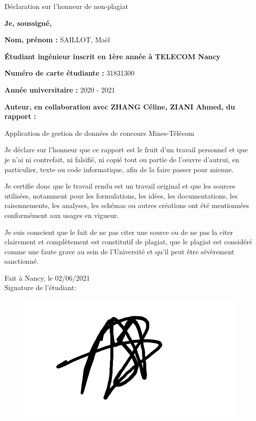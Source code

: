 

%

\begin{center}
\LARGE
    Déclaration sur l'honneur de non-plagiat
\end{center}

\textbf{Je, soussigné,} 

\textbf{Nom, prénom :} SAILLOT, Maël

\textbf{Étudiant ingénieur inscrit en 1ère année à TELECOM Nancy} 

\textbf{Numéro de carte étudiante :} 31831300

\textbf{Année universitaire :} 2020 - 2021 

\textbf{Auteur, en collaboration avec ZHANG Céline, ZIANI Ahmed, du rapport : } 

\begin{center}
\Large
    Application de gestion de données de concours Mines-Télécom 
\end{center}


Je déclare sur l’honneur que ce rapport est le fruit d’un travail personnel et que je n’ai ni contrefait, ni falsifié, ni copié tout ou partie de l’œuvre d’autrui, en particulier, texte ou code informatique, afin de la faire passer pour mienne.

Je certifie donc que le travail rendu est un travail original et que les sources utilisées, notamment pour les formulations, les idées, les documentations, les raisonnements, les analyses, les schémas ou autres créations ont été mentionnées conformément aux usages en vigueur.

Je suis conscient que le fait de ne pas citer une source ou de ne pas la citer clairement et complètement est constitutif de plagiat, que le plagiat est considéré comme une faute grave au sein de l’Université et qu’il peut être sévèrement sanctionné. \\


\begin{flushright}
Fait à Nancy, le 02/06/2021 \\
Signature de l'étudiant:
\end{flushright}
\begin{figure}[!h]
    \begin{flushright}
        \includegraphics[scale=0.35]{Images/Signatures/Signature_MS.png}
    \end{flushright}
\end{figure}
